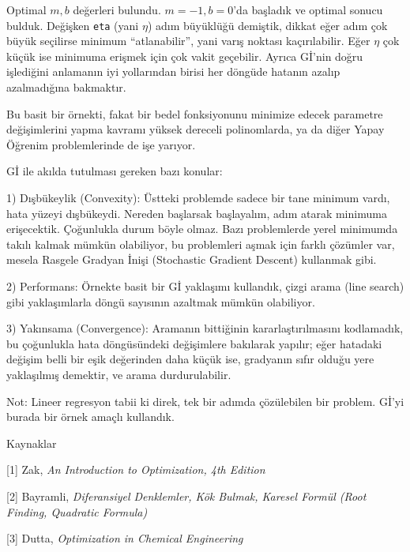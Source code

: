 \documentclass[12pt,fleqn]{article}\usepackage{../../common}
\begin{document}
Optimal $m,b$ değerleri bulundu. $m=-1, b=0$'da başladık ve optimal sonucu
bulduk. Değişken \verb!eta! (yani $\eta$) adım büyüklüğü demiştik, dikkat eğer
adım çok büyük seçilirse minimum ``atlanabilir'', yani varış noktası
kaçırılabilir. Eğer $\eta$ çok küçük ise minimuma erişmek için çok vakit
geçebilir. Ayrıca Gİ'nin doğru işlediğini anlamanın iyi yollarından birisi her
döngüde hatanın azalıp azalmadığına bakmaktır.

Bu basit bir örnekti, fakat bir bedel fonksiyonunu minimize edecek parametre
değişimlerini yapma kavramı yüksek dereceli polinomlarda, ya da diğer Yapay
Öğrenim problemlerinde de işe yarıyor.

Gİ ile akılda tutulması gereken bazı konular:

1) Dışbükeylik (Convexity): Üstteki problemde sadece bir tane minimum vardı,
hata yüzeyi dışbükeydi. Nereden başlarsak başlayalım, adım atarak minimuma
erişecektik. Çoğunlukla durum böyle olmaz. Bazı problemlerde yerel minimumda
takılı kalmak mümkün olabiliyor, bu problemleri aşmak için farklı çözümler var,
mesela Rasgele Gradyan İnişi (Stochastic Gradient Descent) kullanmak gibi.

2) Performans: Örnekte basit bir Gİ yaklaşımı kullandık, çizgi arama (line
search) gibi yaklaşımlarla döngü sayısının azaltmak mümkün olabiliyor.

3) Yakınsama (Convergence): Aramanın bittiğinin kararlaştırılmasını kodlamadık,
bu çoğunlukla hata döngüsündeki değişimlere bakılarak yapılır; eğer hatadaki
değişim belli bir eşik değerinden daha küçük ise, gradyanın sıfır olduğu yere
yaklaşılmış demektir, ve arama durdurulabilir.

Not: Lineer regresyon tabii ki direk, tek bir adımda çözülebilen bir
problem. Gİ'yi burada bir örnek amaçlı kullandık. 

Kaynaklar 

[1] Zak, {\em An Introduction to Optimization, 4th Edition}

[2] Bayramli, {\em Diferansiyel Denklemler, Kök Bulmak, Karesel Formül (Root Finding, Quadratic Formula)}

[3] Dutta, {\em Optimization in Chemical Engineering}
\end{document}
